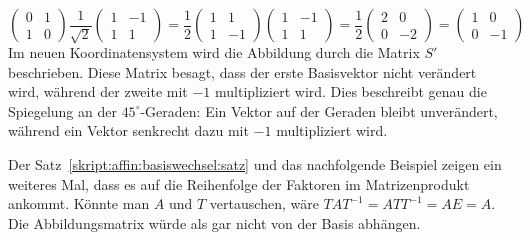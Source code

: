 \begin{beispiel}
\[\begin{pmatrix}
0&1\\1&0
\end{pmatrix}
\frac1{\sqrt{2}}\begin{pmatrix}
1&-1\\
1&1
\end{pmatrix}
=
\frac12
\begin{pmatrix}
1&1\\1&-1
\end{pmatrix}
\begin{pmatrix}
1&-1\\1&1
\end{pmatrix}
=
\frac12
\begin{pmatrix}
2&0\\0&-2
\end{pmatrix}
=
\begin{pmatrix}
1&0\\0&-1
\end{pmatrix}
\]
Im neuen Koordinatensystem wird die Abbildung durch die Matrix $S'$
beschrieben.
Diese Matrix besagt, dass der erste Basisvektor nicht verändert wird,
während der zweite mit $-1$ multipliziert wird.
Dies beschreibt genau die Spiegelung an der $45^\circ$-Geraden:
Ein Vektor auf der Geraden bleibt unverändert, während ein Vektor
senkrecht dazu mit $-1$ multipliziert wird.
\end{beispiel}

Der Satz~\ref{skript:affin:basiswechsel:satz} und das nachfolgende 
Beispiel zeigen ein weiteres Mal, dass es auf die Reihenfolge der
Faktoren im Matrizenprodukt ankommt.
Könnte man $A$ und $T$ vertauschen, wäre $TAT^{-1}=ATT^{-1}=AE=A$.
Die Abbildungsmatrix würde als gar nicht von der Basis abhängen.


